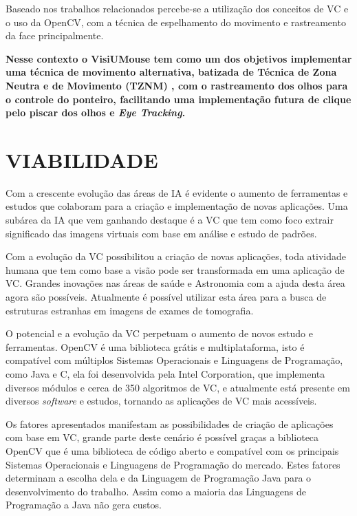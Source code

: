 Baseado nos trabalhos relacionados percebe-se a utilização dos conceitos de VC e o uso da OpenCV, com a técnica de espelhamento do movimento e rastreamento da face principalmente. 



\textbf{Nesse contexto o VisiUMouse tem como um dos objetivos implementar uma técnica de movimento alternativa, batizada de Técnica de Zona Neutra e de Movimento (TZNM) , com o rastreamento dos olhos para o controle do ponteiro, facilitando uma implementação futura de clique pelo piscar dos olhos e \textit{Eye Tracking}.}



\section{VIABILIDADE}\label{Sub:viabilidade}

Com a crescente evolução das áreas de IA é evidente o aumento de ferramentas e estudos que colaboram para a criação e implementação de novas aplicações. Uma subárea da IA que vem ganhando destaque é a VC que tem como foco extrair significado das imagens virtuais com base em análise e estudo de padrões.

Com a evolução da VC possibilitou a criação de novas aplicações, toda atividade humana que tem como base a visão pode ser transformada em uma aplicação de VC. Grandes inovações nas áreas de saúde e Astronomia com a ajuda desta área agora são possíveis. Atualmente é possível utilizar esta área para a busca de estruturas estranhas em imagens de exames de tomografia. 
    
O potencial e a evolução da VC perpetuam o aumento de novos estudo e ferramentas. OpenCV é uma biblioteca grátis e multiplataforma, isto é compatível com múltiplos Sistemas Operacionais e Linguagens de Programação, como Java e C, ela foi desenvolvida pela Intel Corporation, que implementa diversos módulos e cerca de 350 algoritmos de VC, e atualmente está presente em diversos \textit{software} e estudos, tornando as aplicações de VC mais acessíveis.  

Os fatores apresentados manifestam as possibilidades de criação de aplicações com base em VC, grande parte deste cenário é possível graças a biblioteca OpenCV que é uma biblioteca de código aberto e compatível com os principais Sistemas Operacionais e Linguagens de Programação do mercado. Estes fatores determinam a escolha dela e da Linguagem de Programação Java para o desenvolvimento do trabalho. Assim como a maioria das Linguagens de Programação a Java não gera custos.

